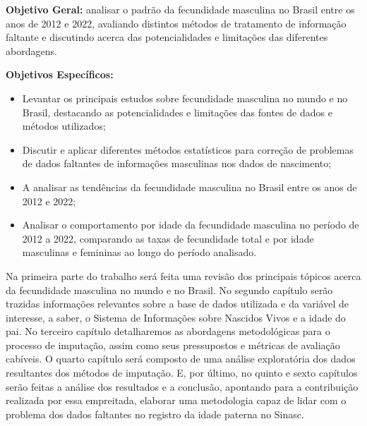 
\textbf{Objetivo Geral:} analisar o padrão da fecundidade masculina no Brasil entre os anos de 2012 e 2022, avaliando distintos métodos de tratamento de informação faltante e discutindo acerca das potencialidades e limitações das diferentes abordagens.


\textbf{Objetivos Específicos:}

\begin{itemize}

         \item Levantar os principais estudos sobre fecundidade masculina no mundo e no Brasil, destacando as potencialidades e limitações das fontes de dados e métodos utilizados; 
        \item Discutir e aplicar diferentes métodos estatísticos para correção de problemas de dados faltantes de informações masculinas nos dados de nascimento;
        \item A analisar as tendências da fecundidade masculina no Brasil entre os anos de 2012 e 2022;
        \item Analisar o comportamento por idade da fecundidade masculina no período de 2012 a 2022, comparando as taxas de fecundidade total e por idade masculinas e femininas ao longo do período analisado.

\end{itemize}


Na primeira parte do trabalho será feita uma revisão dos principais tópicos acerca da fecundidade masculina no mundo e no Brasil. No segundo capítulo serão trazidas informações relevantes sobre a base de dados utilizada e da variável de interesse, a saber, o Sistema de Informações sobre Nascidos Vivos e a idade do pai. No terceiro capítulo detalharemos as abordagens metodológicas para o processo de imputação, assim como seus pressupostos e métricas de avaliação cabíveis. O quarto capítulo será composto de uma análise exploratória dos dados resultantes dos métodos de imputação. E, por último, no quinto e sexto capítulos serão feitas a análise dos resultados e a conclusão, apontando para a contribuição realizada por essa empreitada, elaborar uma metodologia capaz de lidar com o problema dos dados faltantes no registro da idade paterna no Sinasc. 